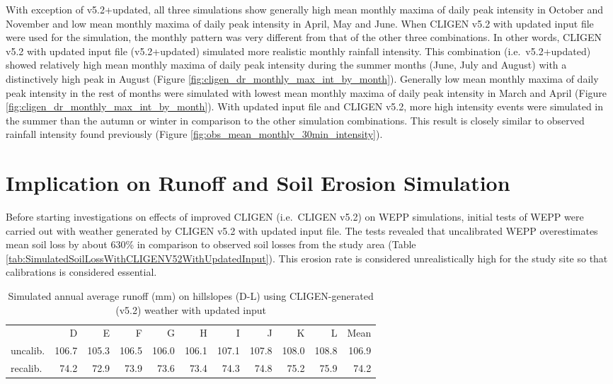With exception of v5.2+updated, all three simulations show generally high mean
monthly maxima of daily peak intensity in October and November and low mean
monthly maxima of daily peak intensity in April, May and June. When CLIGEN v5.2
with updated input file were used for the simulation, the monthly pattern was
very different from that of the other three combinations. In other words,
CLIGEN v5.2 with updated input file (v5.2+updated) simulated more realistic
monthly rainfall intensity.
This combination (i.e.\ v5.2+updated) showed relatively high mean monthly
maxima of daily peak intensity during the summer months (June, July and August)
with a distinctively high peak in August (Figure
\ref{fig:cligen_dr_monthly_max_int_by_month}). Generally low mean monthly maxima
of daily peak intensity in the rest of months were simulated with lowest mean
monthly maxima of daily peak intensity in March and April (Figure
\ref{fig:cligen_dr_monthly_max_int_by_month}). With updated input file and
CLIGEN v5.2, more high intensity events were simulated in the summer than the
autumn or winter in comparison to the other simulation combinations. This result
is closely similar to observed rainfall intensity found previously (Figure
\ref{fig:obs_mean_monthly_30min_intensity}).

\section{Implication on Runoff and Soil Erosion Simulation}
\label{sec:RunoffAndSoilLossSimulation}
Before starting investigations on effects of improved CLIGEN (i.e.\ CLIGEN v5.2)
on WEPP simulations, initial tests of WEPP were carried out with weather
generated by CLIGEN v5.2 with updated input file. The tests revealed that
uncalibrated WEPP overestimates mean soil loss by about 630\% in comparison to
observed soil losses from the study area (Table
\ref{tab:SimulatedSoilLossWithCLIGENV52WithUpdatedInput}). This erosion rate is
considered unrealistically high for the study site so that calibrations is
considered essential.

\begin{table}[htbp]
  \centering
  \caption[Simulated annual average runoff on hillslopes using
CLIGEN-generated weather with updated input]{Simulated annual average runoff
(mm) on hillslopes (D-L) using CLIGEN-generated (v5.2) weather with updated
input}
  \label{tab:SimulatedRunoffWithCLIGENV52WithUpdatedInput}
  \small
    \begin{tabular}{lrrrrrrrrrr}
      \toprule
      & D & E & F & G & H & I & J & K & L & Mean\\
      \cmidrule{2-11}
      uncalib. & 106.7 & 105.3 & 106.5 & 106.0 & 106.1 & 107.1 & 107.8 & 108.0 &
108.8 & 106.9\\
      recalib. & 74.2 & 72.9 & 73.9 & 73.6 & 73.4 & 74.3 & 74.8 & 75.2 & 75.9 &
74.2\\
      \bottomrule
    \end{tabular}
\end{table}

